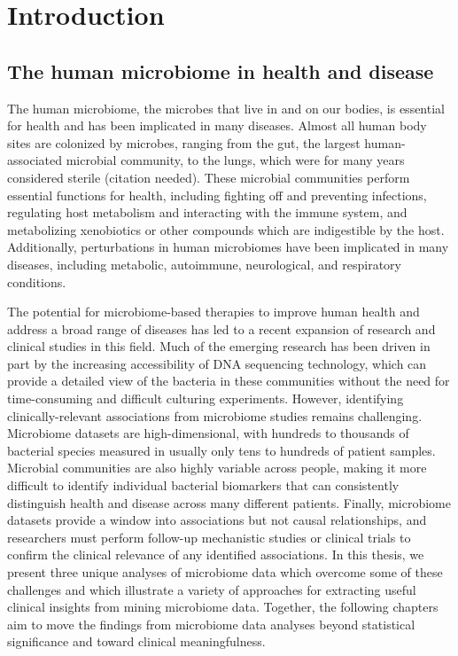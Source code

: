 
\chapter{Introduction}

\section{The human microbiome in health and disease}

The human microbiome, the microbes that live in and on our bodies, is essential for health and has been implicated in many diseases.
Almost all human body sites are colonized by microbes, ranging from the gut, the largest human-associated microbial community, to the lungs, which were for many years considered sterile (citation needed).
These microbial communities perform essential functions for health, including fighting off and preventing infections, regulating host metabolism and interacting with the immune system, and metabolizing xenobiotics or other compounds which are indigestible by the host.
Additionally, perturbations in human microbiomes have been implicated in many diseases, including metabolic, autoimmune, neurological, and respiratory conditions.

The potential for microbiome-based therapies to improve human health and address a broad range of diseases has led to a recent expansion of research and clinical studies in this field.
Much of the emerging research has been driven in part by the increasing accessibility of DNA sequencing technology, which can provide a detailed view of the bacteria in these communities without the need for time-consuming and difficult culturing experiments.
However, identifying clinically-relevant associations from microbiome studies remains challenging.
Microbiome datasets are high-dimensional, with hundreds to thousands of bacterial species measured in usually only tens to hundreds of patient samples.
Microbial communities are also highly variable across people, making it more difficult to identify individual bacterial biomarkers that can consistently distinguish health and disease across many different patients.
Finally, microbiome datasets provide a window into associations but not causal relationships, and researchers must perform follow-up mechanistic studies or clinical trials to confirm the clinical relevance of any identified associations.
In this thesis, we present three unique analyses of microbiome data which overcome some of these challenges and which illustrate a variety of approaches for extracting useful clinical insights from mining microbiome data.
Together, the following chapters aim to move the findings from microbiome data analyses beyond statistical significance and toward clinical meaningfulness.

